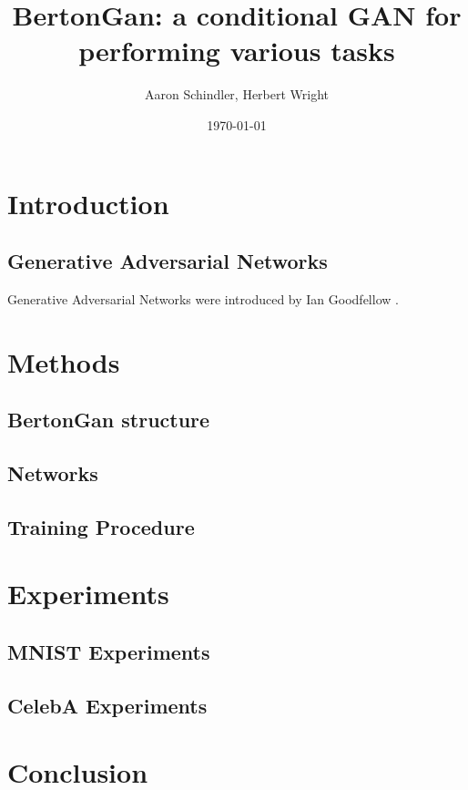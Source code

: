 \documentclass{article}
\title{BertonGan: a conditional GAN for performing various tasks}
\author{ Aaron Schindler, Herbert Wright }
\date{\today}
\begin{document}
\maketitle
\pagebreak

\section{Introduction}

\subsection{Generative Adversarial Networks}

Generative Adversarial Networks were introduced by Ian Goodfellow \cite{goodfellow2020generative}.

\section{Methods}

\subsection{BertonGan structure}

\subsection{Networks}

\subsection{Training Procedure}


\section{Experiments}

\subsection{MNIST Experiments}

\subsection{CelebA Experiments}

\section{Conclusion}

\pagebreak



\end{document}
